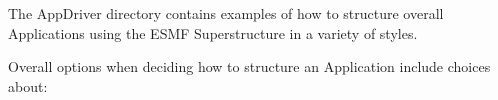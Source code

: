 %


The AppDriver directory contains examples of how to structure overall
Applications using the ESMF Superstructure in a variety of styles.

Overall options when deciding how to structure an Application include
choices about:


